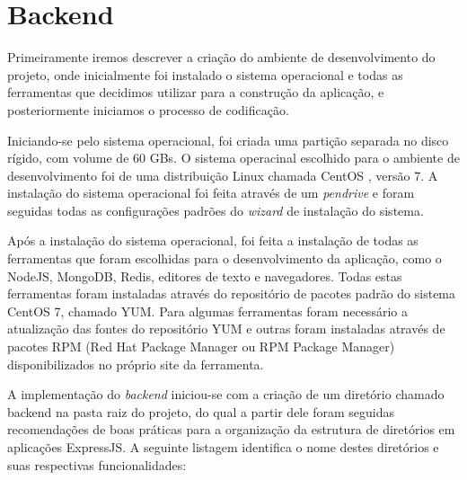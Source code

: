 \section{Backend}
Primeiramente iremos descrever a criação do ambiente de desenvolvimento do projeto, onde inicialmente foi instalado o sistema operacional e todas as ferramentas que decidimos utilizar para a construção da aplicação, e posteriormente iniciamos o processo de codificação.

Iniciando-se pelo sistema operacional, foi criada uma partição separada no disco rígido, com volume de 60 GBs. O sistema operacinal escolhido para o ambiente de desenvolvimento foi de uma distribuição Linux chamada CentOS \cite{centos}, versão 7. A instalação do sistema operacional foi feita através de um \textit{pendrive} e foram seguidas todas as configurações padrões do \textit{wizard} de instalação do sistema.

Após a instalação do sistema operacional, foi feita a instalação de todas as ferramentas que foram escolhidas para o desenvolvimento da aplicação, como o NodeJS, MongoDB, Redis, editores de texto e navegadores. Todas estas ferramentas foram instaladas através do repositório de pacotes padrão do sistema CentOS 7, chamado YUM. Para algumas ferramentas foram necessário a atualização das fontes do repositório YUM e outras foram instaladas através de pacotes RPM (Red Hat Package Manager ou RPM Package Manager) disponibilizados no próprio site da ferramenta.

A implementação do \textit{backend} iniciou-se com a criação de um diretório chamado backend na pasta raiz do projeto, do qual a partir dele foram seguidas recomendações de boas práticas \cite{express-app-structure} para a organização da estrutura de diretórios em aplicações ExpressJS. A seguinte listagem identifica o nome destes diretórios e suas respectivas funcionalidades:

